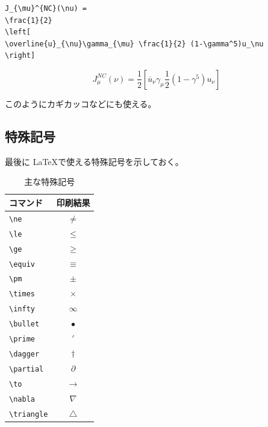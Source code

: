 \begin{reidai}
\begin{verbatim}
J_{\mu}^{NC}(\nu) =
\frac{1}{2}
\left[
\overline{u}_{\nu}\gamma_{\mu} \frac{1}{2} (1-\gamma^5)u_\nu
\right]
\end{verbatim}
\end{reidai}
\vspace*{-1.5em}
\begin{kekka}
  \begin{equation}
    J_{\mu}^{NC}(\nu) =
    \frac{1}{2}
    \left[
      \overline{u}_{\nu}\gamma_{\mu} \frac{1}{2} (1-\gamma^5)u_\nu
    \right]
  \end{equation}
  \vspace{0pt}
\end{kekka} \noindent
このようにカギカッコなどにも使える。

\subsection{特殊記号}
\label{sec:latex:symbol}

最後に \LaTeX で使える特殊記号を示しておく。
\begin{table}[H]
  \begin{center}
    \caption{主な特殊記号}
    \label{tab:symbol}
    \begin{tabular}{|lc|}
      \hline
      コマンド & 印刷結果 \\
      \hline \hline
      \verb|\ne| & $\ne$ \\
      \verb|\le| & $\le$ \\
      \verb|\ge| & $\ge$ \\
      \verb|\equiv| & $\equiv$ \\
      \verb|\pm| & $\pm$ \\
      \verb|\times| & $\times$ \\
      \verb|\infty| & $\infty$ \\
      \verb|\bullet| & $\bullet$ \\
      \verb|\prime| & $\prime$ \\
      \verb|\dagger| & $\dagger$ \\
      \verb|\partial| & $\partial$ \\
      \verb|\to| & $\to$ \\
      \verb|\nabla| & $\nabla$ \\
      \verb|\triangle| & $\triangle$ \\
      \hline
    \end{tabular}
  \end{center}
\end{table}

